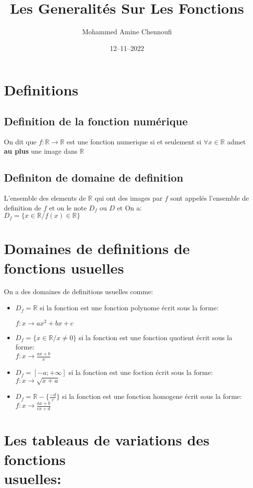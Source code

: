 \documentclass[12pt]{extarticle}
\title{Les Generalités Sur Les Fonctions}
\date{12--11--2022}
\author{Mohammed Amine Chennoufi}
\begin{document}
\maketitle
\tableofcontents
\newpage

\section{Definitions }
\subsection{Definition de la fonction numérique}
On dit que $f: \mathbb{R} \rightarrow \mathbb{R}$ est une fonction numerique si et seulement si 
$\forall x \in \mathbb{R}$ admet \textbf{au plus} une image dans $\mathbb{R}$

\subsection{Definiton de domaine de definition}
L'ensemble des elements de $\mathbb{R}$ qui ont des images par $f$ sont appelés
l'ensemble de definition de $f$ et on le note $D_f$ ou $D$
et On a:\\
$D_f = \{x \in \mathbb{R}/f(x) \in \mathbb{R}\}$
\section{Domaines de definitions de fonctions usuelles}
On a des domaines de definitions usuelles comme: 
\begin{itemize}
	\item $D_f = \mathbb{R}$ si la fonction est une fonction polynome écrit sous la forme:

$f:x \rightarrow ax^2 + bx + c $
\item $D_f = \{x \in \mathbb{R}/ x \neq 0\}$ si la fonction est une fonction quotient écrit sous la forme: \\
	$f:x \rightarrow \frac{ax+b}{x} $
\item $D_f = [-a;+\infty]$ si la fonction est une foction écrit sous la forme: \\
	$f:x  \rightarrow \sqrt{x + a} $
\item $D_f = \mathbb{R} - \{ \frac{-d}{c}\} $ si la fonction est une fonction homogene écrit sous la forme:\\
	$f:x \rightarrow \displaystyle\frac{ax + b}{cx + d} $

\end{itemize}
\newpage
\section{Les tableaus de variations des fonctions \\usuelles:}
\end{document}
